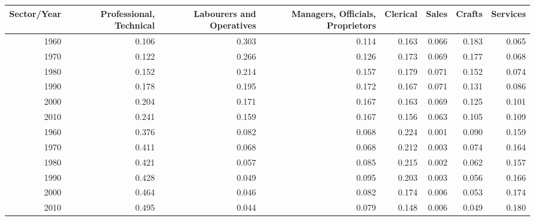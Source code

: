 \begin{tabular}{rrrrrrrr}
  \hline
Sector/Year & Professional, Technical & Labourers and Operatives & Managers, Officials, Proprietors & Clerical & Sales & Crafts & Services \\ 
  \hline
1960 & 0.106 & 0.303 & 0.114 & 0.163 & 0.066 & 0.183 & 0.065 \\ 
  1970 & 0.122 & 0.266 & 0.126 & 0.173 & 0.069 & 0.177 & 0.068 \\ 
  1980 & 0.152 & 0.214 & 0.157 & 0.179 & 0.071 & 0.152 & 0.074 \\ 
  1990 & 0.178 & 0.195 & 0.172 & 0.167 & 0.071 & 0.131 & 0.086 \\ 
  2000 & 0.204 & 0.171 & 0.167 & 0.163 & 0.069 & 0.125 & 0.101 \\ 
  2010 & 0.241 & 0.159 & 0.167 & 0.156 & 0.063 & 0.105 & 0.109 \\ 
  1960 & 0.376 & 0.082 & 0.068 & 0.224 & 0.001 & 0.090 & 0.159 \\ 
  1970 & 0.411 & 0.068 & 0.068 & 0.212 & 0.003 & 0.074 & 0.164 \\ 
  1980 & 0.421 & 0.057 & 0.085 & 0.215 & 0.002 & 0.062 & 0.157 \\ 
  1990 & 0.428 & 0.049 & 0.095 & 0.203 & 0.003 & 0.056 & 0.166 \\ 
  2000 & 0.464 & 0.046 & 0.082 & 0.174 & 0.006 & 0.053 & 0.174 \\ 
  2010 & 0.495 & 0.044 & 0.079 & 0.148 & 0.006 & 0.049 & 0.180 \\ 
   \hline
\end{tabular}
